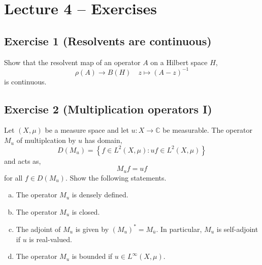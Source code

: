 \section{Lecture 4 -- Exercises}

\subsection{Exercise 1 (Resolvents are continuous)}

Show that the resolvent map of an operator $A$ on a Hilbert space $H$,
\begin{equation*}
	\rho(A)\to B(H) \quad z\mapsto (A-z)^{-1}
\end{equation*}
is continuous.

\subsection{Exercise 2 (Multiplication operators I)}

Let $(X,\mu)$ be a measure space and let $u:X\to\mathbb{C}$ be measurable. The operator $M_{u}$ of multiplcation by $u$ has domain,
\begin{equation*}
	D(M_{u}) = \left\{f\in L^{2}(X,\mu)\colon uf\in L^{2}(X,\mu)\right\}
\end{equation*}
and acts as,
\begin{equation*}
	M_{u}f = uf
\end{equation*}
for all $f\in D(M_{u})$. Show the following statements.
\begin{enumerate}[(a)]
	\item
		The operator $M_{u}$ is densely defined.
	\item
		The operator $M_{u}$ is closed.
	\item
		The adjoint of $M_{u}$ is given by $(M_{u})^{*} = M_{\overline{u}}$. In particular, $M_{u}$ is self-adjoint if $u$ is real-valued.
	\item
		The operator $M_{u}$ is bounded if $u\in L^{\infty}(X,\mu)$.
\end{enumerate}

